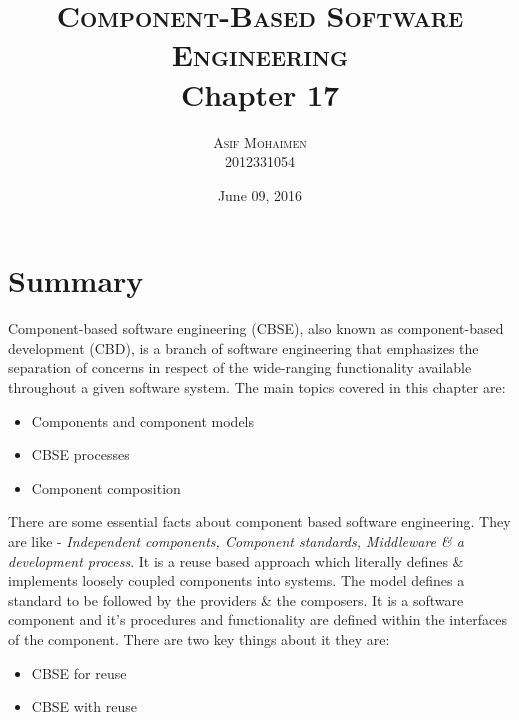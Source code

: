 \documentclass[dvips,12pt]{article}
\begin{document}
\title{
  \textsc{Component-Based Software Engineering}\\
  Chapter 17
}
\author{
  \textsc{Asif Mohaimen}\\
  2012331054\\
}
\date{June 09, 2016}

\maketitle


\section*{Summary}
Component-based software engineering (CBSE), also known as component-based development (CBD), is a branch of software engineering that emphasizes the separation of concerns in respect of the wide-ranging functionality available throughout a given software system. The main topics covered in this chapter are:
\begin{itemize}
\item Components and component models 
\item CBSE processes
\item Component composition
\end{itemize}
There are some essential facts about component based software engineering. They are like - \emph{Independent components, Component standards,  Middleware \& a development process}.  It is a reuse based approach which literally defines \& implements loosely coupled components into systems. The model defines a standard to be followed by the providers \& the composers. It is a software component and it's procedures and functionality are defined within the interfaces of the component. There are two key things about it they are:
\begin{itemize}
\item{CBSE for reuse}
\item{CBSE with reuse}

\end{itemize}
\end{document}

